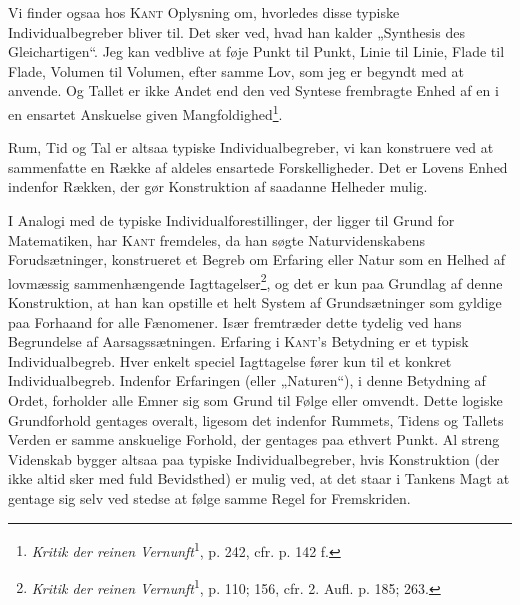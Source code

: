 \documentclass[12pt]{article}
\newcommand{\opage}[1]{\marginnote{\footnotesize\textit{[#1]}}}
\begin{document}
Vi finder ogsaa hos \textsc{Kant} Oplysning om, hvorledes disse typiske
Individualbegreber bliver til. Det sker ved, hvad han kalder „Synthesis des
Gleichartigen“. Jeg kan vedblive at føje Punkt til Punkt, Linie til Linie, Flade til
Flade, Volumen til Volumen, efter samme Lov, som jeg er begyndt med at anvende. Og
Tallet er
\setcounter{footnote}{0}%
\opage{35}ikke Andet end den ved Syntese frembragte Enhed af en i en ensartet
Anskuelse given Mangfoldighed\footnote{\textit{Kritik der reinen
Vernunft}\textsuperscript{1}, p. 242, cfr. p. 142 f.}.

Rum, Tid og Tal er altsaa typiske Individualbegreber, vi kan konstruere ved
at sammenfatte en Række af aldeles ensartede Forskelligheder. Det er Lovens
Enhed indenfor Rækken, der gør Konstruktion af saadanne Helheder mulig.

I Analogi med de typiske Individualforestillinger, der ligger til Grund for
Matematiken, har \textsc{Kant} fremdeles, da han søgte Naturvidenskabens
Forudsætninger, konstrueret et Begreb om Erfaring eller Natur som en Helhed af
lovmæssig sammenhængende Iagttagelser\footnote{\textit{Kritik der reinen
Vernunft}\textsuperscript{1}, p. 110; 156, cfr. 2. Aufl. p. 185; 263.}, og det
er kun paa Grundlag af denne Konstruktion, at han kan opstille et helt System
af Grundsætninger som gyldige paa Forhaand for alle Fænomener. Især fremtræder
dette tydelig ved hans Begrundelse af Aarsagssætningen. Erfaring i
\textsc{Kant}'s Betydning er et typisk Individualbegreb. Hver enkelt speciel
Iagttagelse fører kun til et konkret Individualbegreb. Indenfor Erfaringen
(eller „Naturen“), i denne Betydning af Ordet, forholder alle Emner sig som
Grund til Følge eller omvendt. Dette logiske Grundforhold gentages overalt,
ligesom det indenfor Rummets, Tidens og Tallets Verden er samme anskuelige
Forhold, der gentages paa ethvert Punkt. Al streng Videnskab bygger altsaa paa
typiske Individualbegreber, hvis Konstruktion (der ikke altid sker med fuld
Bevidsthed) er mulig ved, at det staar i Tankens Magt at gentage sig selv ved
stedse at følge samme Regel for Fremskriden.
\end{document}
